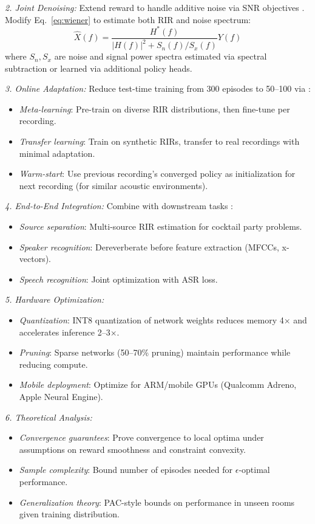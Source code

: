 \documentclass[12pt,a4paper]{article}
\begin{document}
\textit{2. Joint Denoising:} Extend reward to handle additive noise via SNR objectives \cite{vincent2018audio,wang2018supervised}. Modify Eq.~\eqref{eq:wiener} to estimate both RIR and noise spectrum:
\begin{equation}
\hat{X}(f) = \frac{H^*(f)}{|H(f)|^2 + S_n(f)/S_x(f)} Y(f)
\end{equation}
where $S_n, S_x$ are noise and signal power spectra estimated via spectral subtraction or learned via additional policy heads.

\textit{3. Online Adaptation:} Reduce test-time training from 300 episodes to 50--100 via \cite{tzinis2022remixit,wang2020self}:
\begin{itemize}
\item \textit{Meta-learning}: Pre-train on diverse RIR distributions, then fine-tune per recording.
\item \textit{Transfer learning}: Train on synthetic RIRs, transfer to real recordings with minimal adaptation.
\item \textit{Warm-start}: Use previous recording's converged policy as initialization for next recording (for similar acoustic environments).
\end{itemize}

\textit{4. End-to-End Integration:} Combine with downstream tasks \cite{luo2019conv,delcroix2015context}:
\begin{itemize}
\item \textit{Source separation}: Multi-source RIR estimation for cocktail party problems.
\item \textit{Speaker recognition}: Dereverberate before feature extraction (MFCCs, x-vectors).
\item \textit{Speech recognition}: Joint optimization with ASR loss.
\end{itemize}

\textit{5. Hardware Optimization:} 
\begin{itemize}
\item \textit{Quantization}: INT8 quantization of network weights reduces memory 4$\times$ and accelerates inference 2--3$\times$.
\item \textit{Pruning}: Sparse networks (50--70\% pruning) maintain performance while reducing compute.
\item \textit{Mobile deployment}: Optimize for ARM/mobile GPUs (Qualcomm Adreno, Apple Neural Engine).
\end{itemize}

\textit{6. Theoretical Analysis:}
\begin{itemize}
\item \textit{Convergence guarantees}: Prove convergence to local optima under assumptions on reward smoothness and constraint convexity.
\item \textit{Sample complexity}: Bound number of episodes needed for $\epsilon$-optimal performance.
\item \textit{Generalization theory}: PAC-style bounds on performance in unseen rooms given training distribution.
\end{itemize}
\end{document}
